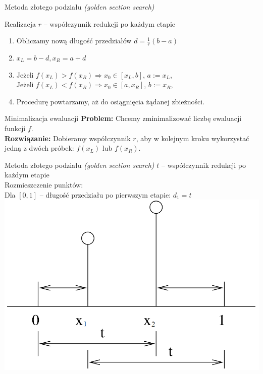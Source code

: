   \begin{frame}{Metoda złotego podziału \emph{(golden section search)}}
    \begin{block}{Realizacja}
      $r$ -- współczynnik redukcji po każdym etapie
      \begin{enumerate}
        \item Obliczamy nową długość przedziałów $ d = \frac{1}{r}(b - a) $
        \item $ x_L = b - d, x_R = a + d $
        \item Jeżeli $ f(x_L) > f(x_R) \Rightarrow x_0 \in [x_L, b] $,
              $ a := x_L \text{, } $\\
              Jeżeli $ f(x_L) < f(x_R) \Rightarrow x_0 \in [a, x_R] $,
              $ b := x_R \text{, } $
        \item Procedurę powtarzamy, aż do osiągnięcia żądanej zbieżności.
      \end{enumerate}
    \end{block}
    \begin{block}{Minimalizacja ewaluacji}
      \textbf{Problem:} Chcemy zminimalizować liczbę ewaluacji funkcji $f$.\\
      \textbf{Rozwiązanie:} Dobieramy współczynnik $r$, aby w kolejnym kroku wykorzystać jedną z dwóch próbek: $f(x_L)$ lub $f(x_R)$.
    \end{block}
  \end{frame}
  \begin{frame}{Metoda złotego podziału \emph{(golden section search)}}
    $t$ -- współczynnik redukcji po każdym etapie\\
    Rozmieszczenie punktów:\\
    Dla $[0, 1]$ -- długość przedziału po pierwszym etapie: $d_1 = t$\\
    \centering
    \includegraphics[height=0.6\textheight]{img/17/f_uni2}
  \end{frame}

